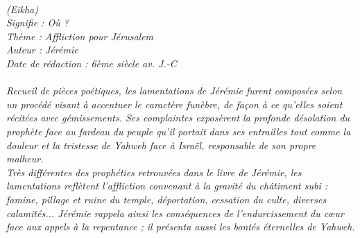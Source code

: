\BFont
\noindent\hrulefill
{\footnotesize
\textit{
\bigskip
{\centering{}
\\(Eikha)
\\Signifie : Où ?
\\Thème : Affliction pour Jérusalem
\\Auteur : Jérémie
\\Date de rédaction : 6ème siècle av. J.-C\\}
}
\textit{
\\Recueil de pièces poétiques,  les lamentations de Jérémie furent composées selon un procédé visant à accentuer le caractère funèbre, de façon à ce qu’elles soient récitées avec gémissements. Ses complaintes exposèrent la profonde désolation du prophète face au fardeau du peuple qu’il portait dans ses entrailles tout comme la douleur et la tristesse de Yahweh face à Israël, responsable de son propre malheur.
\\Très différentes des prophéties retrouvées dans le livre de Jérémie, les lamentations reflètent l’affliction convenant à la gravité du châtiment subi : famine, pillage et ruine du temple, déportation, cessation du culte, diverses calamités... Jérémie rappela ainsi les conséquences de l’endurcissement du cœur face aux appels à la repentance ; il présenta aussi les bontés éternelles de Yahweh.\bigskip
}
}
\par\nobreak\noindent\hrulefill
